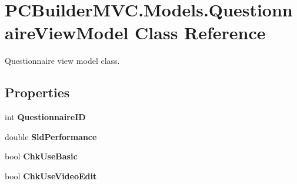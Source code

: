 \hypertarget{class_p_c_builder_m_v_c_1_1_models_1_1_questionnaire_view_model}{}\section{P\+C\+Builder\+M\+V\+C.\+Models.\+Questionnaire\+View\+Model Class Reference}
\label{class_p_c_builder_m_v_c_1_1_models_1_1_questionnaire_view_model}


Questionnaire view model class.  


\subsection*{Properties}
\begin{DoxyCompactItemize}
\item 
int {\bfseries Questionnaire\+ID}\hypertarget{class_p_c_builder_m_v_c_1_1_models_1_1_questionnaire_view_model_a2ca6d2fc71c00f9a77f162cbe7c084d0}{}\label{class_p_c_builder_m_v_c_1_1_models_1_1_questionnaire_view_model_a2ca6d2fc71c00f9a77f162cbe7c084d0}

\item 
double {\bfseries Sld\+Performance}\hypertarget{class_p_c_builder_m_v_c_1_1_models_1_1_questionnaire_view_model_a4bedcd064364f202d8a2d5d9ec4ad6a6}{}\label{class_p_c_builder_m_v_c_1_1_models_1_1_questionnaire_view_model_a4bedcd064364f202d8a2d5d9ec4ad6a6}

\item 
bool {\bfseries Chk\+Use\+Basic}\hypertarget{class_p_c_builder_m_v_c_1_1_models_1_1_questionnaire_view_model_affb40ef1694e3b61546bb35cfeb6ed0c}{}\label{class_p_c_builder_m_v_c_1_1_models_1_1_questionnaire_view_model_affb40ef1694e3b61546bb35cfeb6ed0c}

\item 
bool {\bfseries Chk\+Use\+Video\+Edit}\hypertarget{class_p_c_builder_m_v_c_1_1_models_1_1_questionnaire_view_model_a5a157217cc776e9c17be75f4dcdb8915}{}\label{class_p_c_builder_m_v_c_1_1_models_1_1_questionnaire_view_model_a5a157217cc776e9c17be75f4dcdb8915}


\end{DoxyCompactItemize}
